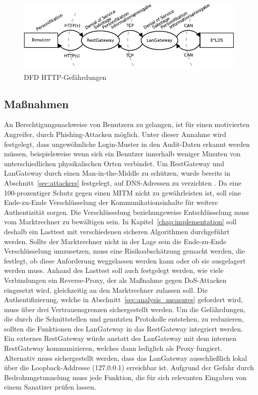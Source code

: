 \documentclass[11pt,a4paper]{report}
\begin{document}
\begin{figure}[htbp]
\centering
\includegraphics[scale=1]{images/dfd_http_threat.pdf}
\caption{DFD HTTP-Gefährdungen}
\label{fig:dfd_http_threat}
\end{figure}

\subsection{Maßnahmen}

An Berechtigungsnachweise von Benutzern zu gelangen, ist für einen motivierten Angreifer, durch Phishing-Attacken möglich. Unter dieser Annahme wird festgelegt, dass ungewöhnliche Login-Muster in den Audit-Daten erkannt werden müssen, beispielsweise wenn sich ein Benutzer innerhalb weniger Minuten von unterschiedlichen physikalischen Orten verbindet. Um RestGateway und LanGateway durch einen Man-in-the-Middle zu schützen, wurde bereits in Abschnitt~\ref{sec:attackers} festgelegt, auf DNS-Adressen zu verzichten \cite{bsi_m5059}. Da eine 100-prozentiger Schutz gegen einen MITM nicht zu gewährleisten ist, soll eine Ende-zu-Ende Verschlüsselung der Kommunikationsinhalte für weitere Authentizität sorgen. Die Verschlüsselung beziehungsweise Entschlüsselung muss vom Marktrechner zu bewältigen sein. In Kapitel~\ref{chap:implementation} soll deshalb ein Lasttest mit verschiedenen sicheren Algorithmen durchgeführt werden. Sollte der Marktrechner nicht in der Lage sein die Ende-zu-Ende Verschlüsselung umzusetzen, muss eine Risikoabschätzung gemacht werden, die festlegt, ob diese Anforderung weggelassen werden kann oder ob sie ausgelagert werden muss. Anhand des Lasttest soll auch festgelegt werden, wie viele Verbindungen ein Reverse-Proxy, der als Maßnahme gegen DoS-Attacken eingesetzt wird, gleichzeitig an den Marktrechner zulassen soll. Die Authentifizierung, welche in Abschnitt~\ref{sec:analysis_measures} gefordert wird, muss über drei Vertrauensgrenzen sichergestellt werden. Um die Gefährdungen, die durch die Schnittstellen und genutzten Protokolle entstehen, zu reduzieren, sollten die Funktionen des LanGateway in das RestGateway integriert werden. Ein externes RestGateway würde anstatt des LanGateway mit dem internen RestGateway kommunizieren, welches dann lediglich als Proxy fungiert. Alternativ muss sichergestellt werden, dass das LanGateway ausschließlich lokal über die Loopback-Addresse (127.0.0.1) erreichbar ist. Aufgrund der Gefahr durch Bedrohungstunnelung muss jede Funktion, die für sich relevanten Eingaben von einem Sanatizer prüfen lassen.
\end{document}
